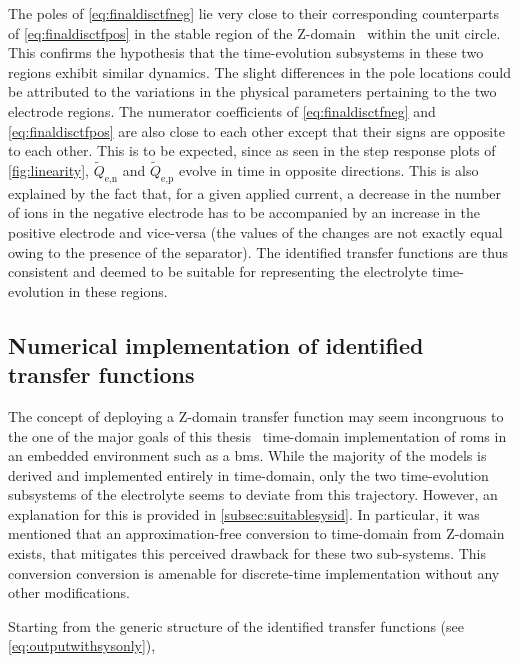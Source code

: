 The  poles of \cref{eq:finaldisctfneg}  lie  very close  to their  corresponding
counterparts of \cref{eq:finaldisctfpos}  in the  stable region of  the Z-domain
\ie~within   the  unit  circle.   This  confirms  the  hypothesis   that  the
time-evolution subsystems  in these  two regions  exhibit similar  dynamics. The
slight differences in  the pole locations could be attributed  to the variations
in  the  physical  parameters  pertaining  to the  two  electrode  regions.  The
numerator coefficients  of \cref{eq:finaldisctfneg} and \cref{eq:finaldisctfpos}
are  also  close  to  each  other  except  that  their  signs  are  opposite  to
each   other.  This   is  to   be   expected,  since   as  seen   in  the   step
response   plots   of \cref{fig:linearity},   $\widetilde{Q}_{\text{e,n}}$   and
$\widetilde{Q}_{\text{e,p}}$ evolve in time in opposite directions. This is also
explained by  the fact  that, for  a given  applied current,  a decrease  in the
number of ions in the negative electrode has to be accompanied by an increase in
the positive electrode and vice-versa (the values of the changes are not exactly
equal owing to the presence of the separator). The identified transfer functions
are thus consistent  and deemed to be suitable for  representing the electrolyte
time-evolution in these regions.

\subsection{Numerical implementation of identified transfer functions}\label{subsec:sysidnumericalimpl}

The  concept of  deploying a  Z-domain  transfer function  may seem  incongruous
to   the  one   of  the   major  goals   of  this   thesis  \viz~time-domain
implementation of  \glspl{rom} in an  embedded environment such as  a \gls{bms}.
While  the  majority of  the  models  is  derived  and implemented  entirely  in
time-domain, only  the two  time-evolution subsystems  of the  electrolyte seems
to  deviate  from   this  trajectory.  However,  an  explanation   for  this  is
provided in \cref{subsec:suitablesysid}.  In particular,  it was  mentioned that
an  approximation-free  conversion to  time-domain  from  Z-domain exists,  that
mitigates this  perceived drawback  for these  two sub-systems.  This conversion
conversion  is  amenable  for  discrete-time implementation  without  any  other
modifications.

Starting from the generic structure of the identified transfer functions (see \cref{eq:outputwithsysonly}),

